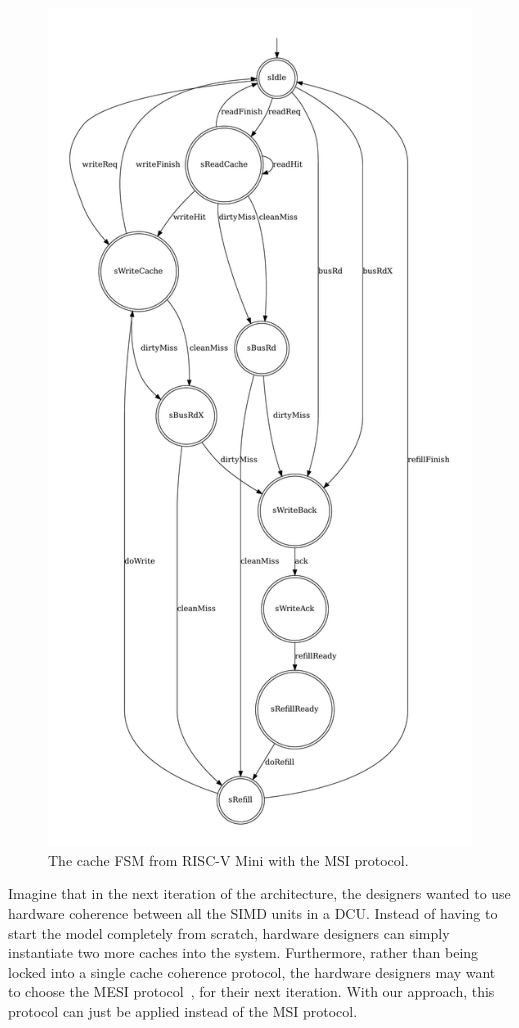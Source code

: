 \documentclass[conference]{IEEEtran}
\begin{document}
\begin{figure}
    \centering
    \includegraphics[width=0.95\linewidth]{figures/cacheFSM2.pdf}
    \caption{The cache FSM from RISC-V Mini with the MSI protocol.}
    \label{fig:cacheAfter}
\end{figure}

Imagine that in the next iteration of the architecture, the designers wanted to use hardware coherence between all the SIMD units in a DCU. Instead of having to start the model completely from scratch, hardware designers can simply instantiate two more caches into the system. Furthermore, rather than being locked into a single cache coherence protocol, the hardware designers may want to choose the MESI protocol~\cite{Papamarcos:84}, for their next iteration. With our approach, this protocol can just be applied instead of the MSI protocol. 
\end{document}
